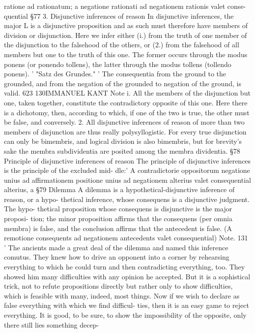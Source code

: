 ratione ad rationatum; a negatione rationati ad negationem rationis valet conse-
quential
§77
3. Disjunctive inferences of reason
In disjunctive inferences, the major L is a disjunctive proposition and as such
must therefore have members of division or disjunction.
Here we infer either (i.) from the truth of one member of the
disjunction to the falsehood of the others, or (2.) from the falsehood of all
members but one to the truth of this one. The former occurs through the
modus ponens (or ponendo tollens), the latter through the modus tollens
(tollendo ponens).
'
"Satz des Grundes."
'
The consequentia from the ground to the grounded, and from the negation of the
grounded to negation of the ground, is valid.
623
130IMMANUEL KANT
Note i. All the members of the disjunction but one, taken together, constitute the
contradictory opposite of this one. Here there is a dichotomy, then,
according to which, if one of the two is true, the other must be false, and
conversely.
2. All disjunctive inferences of reason of more than two members of
disjunction are thus really polysyllogistic. For every true disjunction can
only be bimembris, and logical division is also bimembris, but for brevity's
sake the membra subdividentia are posited among the membra dividentia.
§78
Principle of disjunctive inferences of reason
The principle of disjunctive inferences is the principle of the excluded mid-
dle:'
A contradictorie oppositorum negatione unius ad affirmationem
positione unius ad negationem alterius valet consequential
alterius, a
§79
Dilemma
A dilemma is a hypothetical-disjunctive inference of reason, or a hypo-
thetical inference, whose consequens is a disjunctive judgment. The hypo-
thetical proposition whose consequens is disjunctive is the major proposi-
tion; the minor proposition affirms that the consequens (per omnia membra)
is false, and the conclusion affirms that the antecedent is false. (A remotione
consequents ad negationem antecedents valet consequential)
Note.
131
'
The ancients made a great deal of the dilemma and named this inference
comutus. They knew how to drive an opponent into a corner by rehearsing
everything to which he could turn and then contradicting everything, too.
They showed him many difficulties with any opinion he accepted. But it is
a sophistical trick, not to refute propositions directly but rather only to
show difficulties, which is feasible with many, indeed, most things.
Now if we wish to declare as false everything with which we find difficul-
ties, then it is an easy game to reject everything. It is good, to be sure, to
show the impossibility of the opposite, only there still lies something decep-
